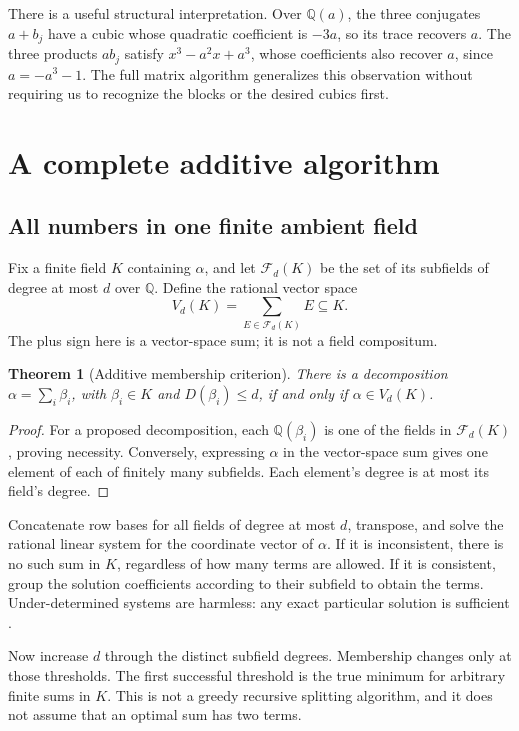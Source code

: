 \documentclass[11pt,letterpaper]{article}
\newtheorem{theorem}{Theorem}[section]
\theoremstyle{definition}
\theoremstyle{remark}
\newcommand{\Q}{\mathbb Q}
\begin{document}
There is a useful structural interpretation. Over \(\Q(a)\), the three
conjugates \(a+b_j\) have a cubic whose quadratic coefficient is \(-3a\),
so its trace recovers \(a\). The three products \(ab_j\) satisfy
\(x^3-a^2x+a^3\), whose coefficients also recover \(a\), since
\(a=-a^3-1\). The full matrix algorithm generalizes this observation
without requiring us to recognize the blocks or the desired cubics first.

\section{A complete additive algorithm}
\label{sec:additive}
\subsection{All numbers in one finite ambient field}
Fix a finite field \(K\) containing \(\alpha\), and let
\(\mathcal F_d(K)\) be the set of its subfields of degree at most \(d\)
over \(\Q\). Define the rational vector space
\[
 V_d(K)=\sum_{E\in\mathcal F_d(K)} E\subseteq K.
\]
The plus sign here is a vector-space sum; it is not a field compositum.

\begin{theorem}[Additive membership criterion]\label{thm:additive}
There is a decomposition \(\alpha=\sum_i\beta_i\), with
\(\beta_i\in K\) and \(D(\beta_i)\leq d\), if and only if
\(\alpha\in V_d(K)\).
\end{theorem}
\begin{proof}
For a proposed decomposition, each \(\Q(\beta_i)\) is one of the fields
in \(\mathcal F_d(K)\), proving necessity. Conversely, expressing
\(\alpha\) in the vector-space sum gives one element of each of finitely
many subfields. Each element's degree is at most its field's degree.
\end{proof}
Concatenate row bases for all fields of degree at most \(d\), transpose,
and solve the rational linear system for the coordinate vector of
\(\alpha\). If it is inconsistent, there is no such sum in \(K\),
regardless of how many terms are allowed. If it is consistent, group the
solution coefficients according to their subfield to obtain the terms.
Under-determined systems are harmless: any exact particular solution is
sufficient \cite{linearsolve}.

Now increase \(d\) through the distinct subfield degrees. Membership changes
only at those thresholds. The first successful threshold is the true
minimum for arbitrary finite sums in \(K\). This is not a greedy recursive
splitting algorithm, and it does not assume that an optimal sum has two terms.
\end{document}
